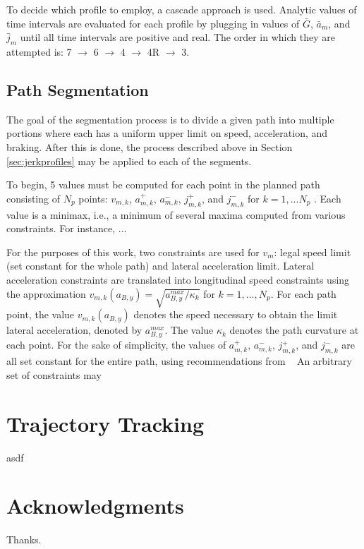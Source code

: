 \documentclass[letterpaper, 10 pt, conference]{ieeeconf}  %
\begin{document}
To decide which profile to employ, a cascade approach is used. Analytic values of time intervals are evaluated for each profile by plugging in values of $\bar{G}$, $\bar{a}_m$, and $\bar{j}_m$ until all time intervals are positive and real. 
The order in which they are attempted is: 7 $\rightarrow$ 6 $\rightarrow$ 4 $\rightarrow$ 4R $\rightarrow$ 3.

\subsection{Path Segmentation}
\label{sec:pathsegmentation}

The goal of the segmentation process is to divide a given path into multiple portions where each has a uniform upper limit on speed, acceleration, and braking.
After this is done, the process described above in Section \ref{sec:jerkprofiles} may be applied to each of the segments.

To begin, 5 values must be computed for each point in the planned path consisting of $N_p$ points: $v_{m,k}$, $a^+_{m,k}$, $a^-_{m,k}$, $j^+_{m,k}$, and $j^-_{m,k}$ for $k = 1, ... N_p$ . Each value is a minimax, i.e., a minimum of several maxima computed from various constraints. For instance, ...

For the purposes of this work, two constraints are used for $v_m$: legal speed limit (set constant for the whole path) and lateral acceleration limit. Lateral acceleration constraints are translated into longitudinal speed constraints using the approximation $v_{m,k}(a_{B,y}) = \sqrt{a_{B,y}^{max}/\kappa_k}$ for $k = 1, ..., N_p$. For each path point, the value $v_{m,k}(a_{B,y})$ denotes the speed necessary to obtain the limit lateral acceleration, denoted by $a^{max}_{B,y}$. The value $\kappa_k$ denotes the path curvature at each point. For the sake of simplicity, the values of $a^+_{m,k}$, $a^-_{m,k}$, $j^+_{m,k}$, and $j^-_{m,k}$ are all set constant for the entire path, using recommendations from ~\cite{Maurya2012}
An arbitrary set of constraints may 

\section{Trajectory Tracking}
\label{sec:trajectorytracking}

asdf

\section*{Acknowledgments}

Thanks.





\end{document}
